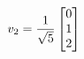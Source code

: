 \documentclass[preview]{standalone}
\begin{document}
\begin{align*}
\special{dvisvgm:raw <g id='unique000'>}v_2 = \frac{1}{\sqrt{5}} \begin{bmatrix} 0 \\ 1 \\ 2 \end{bmatrix}\special{dvisvgm:raw </g>}
\end{align*}
\end{document}
